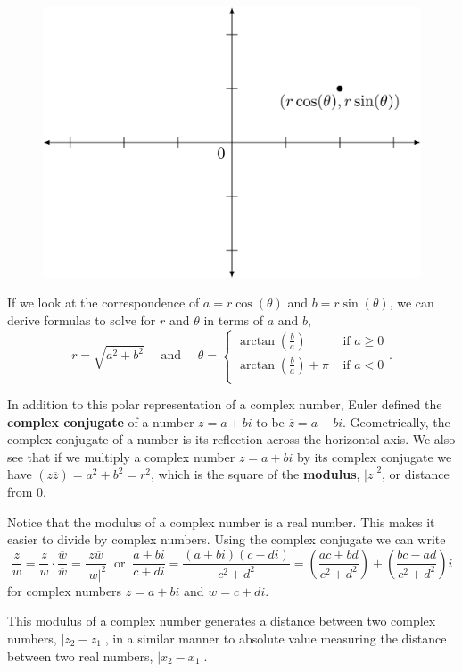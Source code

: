 \documentclass[
]{book}
\theoremstyle{definition}
\theoremstyle{definition}
\theoremstyle{definition}
\theoremstyle{remark}
\begin{document}
\begin{figure}

{\centering \includegraphics[width=0.6\linewidth]{tikz/complex-polar} 

}

\end{figure}

If we look at the correspondence of \(a=r\cos(\theta)\) and \(b=r\sin(\theta)\), we can derive formulas to solve for \(r\) and \(\theta\) in terms of \(a\) and \(b\),
\[r= \sqrt{a^2+b^2} \quad \mbox{ and } \quad \theta = \begin{cases} \arctan\left(\frac{b}{a}\right) & \mbox{ if } a\geq 0 \\
\arctan\left(\frac{b}{a}\right)+\pi & \mbox{ if } a<0\\
\end{cases}.\]

In addition to this polar representation of a complex number, Euler defined the \textbf{complex conjugate} of a number \(z=a+bi\) to be \(\overline{z}=a-bi\). Geometrically, the complex conjugate of a number is its reflection across the horizontal axis. We also see that if we multiply a complex number \(z=a+bi\) by its complex conjugate we have \((z\overline{z}) = a^2+b^2=r^2\), which is the square of the \textbf{modulus}, \(|z|^2\), or distance from \(0\).

Notice that the modulus of a complex number is a real number. This makes it easier to divide by complex numbers. Using the complex conjugate we can write
\[\frac{z}{w} = \frac{z}{w} \cdot \frac{\overline{w}}{\overline{w}} = \frac{z\overline{w}}{|w|^2} \:  \mbox{ or } \: \frac{a+bi}{c+di} = \frac{(a+bi)(c-di)}{c^2+d^2} = \left(\frac{ac+bd}{c^2+d^2}\right) + \left(\frac{bc-ad}{c^2+d^2}\right) i\] for complex numbers \(z=a+bi\) and \(w=c+di\).

This modulus of a complex number generates a distance between two complex numbers, \(|z_2-z_1|\), in a similar manner to absolute value measuring the distance between two real numbers, \(|x_2-x_1|\).
\end{document}
